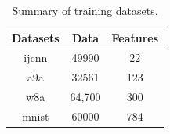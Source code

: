 \documentclass[iicol,sn-basic]{sn-jnl}
\theoremstyle{thmstyleone}%
\theoremstyle{thmstyletwo}%
\theoremstyle{thmstylethree}%
\begin{document}
\begin{table}[htbp]
\begin{center}
\caption{Summary of training datasets.}
\begin{tabular}{ c|c|c } 
 \hline
 Datasets &  Data & Features \\ 
 \hline
  ijcnn & 49990 & 22 \\
  a9a & 32561 & 123 \\ 
 w8a & 64,700  & 300 \\ 
 mnist & 60000 & 784 \\
 \hline
\end{tabular}
\label{metadata}
\end{center}
\end{table}
\end{document}
